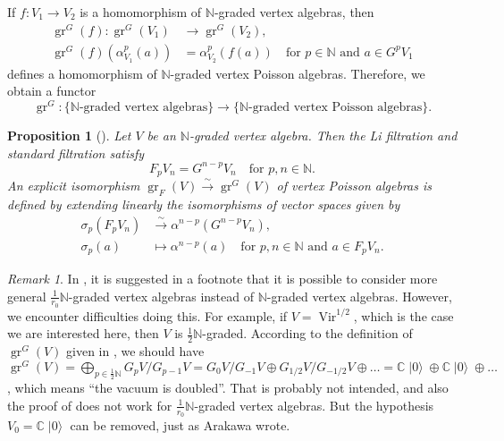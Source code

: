 \documentclass[a4paper, 12pt, reqno]{amsart}
\newtheorem{proposition}[theorem]{Proposition}
\theoremstyle{remark}
\newtheorem{remark}[theorem]{Remark}
\DeclareMathOperator{\Vir}{Vir}
\DeclareMathOperator{\gr}{gr}
\DeclareMathOperator{\vac}{|0\rangle}
\begin{document}
If $f: V_1 \to V_2$ is a homomorphism of $\mathbb{N}$-graded vertex algebras, then
\begin{align*}
  \gr^G(f): \gr^G(V_1) &\to \gr^G(V_2), \\
  \gr^G(f)(\alpha_{V_1}^p(a)) &= \alpha_{V_2}^p(f(a)) \quad \text{for $p \in \mathbb{N}$ and $a \in G^pV_1$}
\end{align*}
defines a homomorphism of $\mathbb{N}$-graded vertex Poisson algebras.
Therefore, we obtain a functor
\begin{equation*}
  \gr^G: \{\text{$\mathbb{N}$-graded vertex algebras}\} \to \{\text{$\mathbb{N}$-graded vertex Poisson algebras}\}.
\end{equation*}

\begin{proposition}[{\cite[Proposition 2.6.1]{arakawa_remark_2012}}]
  \label{prp:15}
  Let $V$ be an $\mathbb{N}$-graded vertex algebra.
  Then the Li filtration and standard filtration satisfy
  \begin{equation*}
    F_pV_n = G^{n - p}V_n \quad \text{for $p, n \in \mathbb{N}$}.
  \end{equation*}
  An explicit isomorphism $\gr_F(V) \xrightarrow{\sim} \gr^G(V)$ of vertex Poisson algebras is defined by extending linearly the isomorphisms of vector spaces given by
  \begin{align*}
    \sigma_p(F_pV_n) &\xrightarrow{\sim} \alpha^{n - p}(G^{n - p}V_n), \\
    \sigma_p(a) &\mapsto \alpha^{n - p}(a) \quad \text{for $p, n \in \mathbb{N}$ and $a \in F_pV_n$}.
  \end{align*}
\end{proposition}

\begin{remark}
  \label{rmk:39}
  In \cite{arakawa_remark_2012}, it is suggested in a footnote that it is possible to consider more general $\tfrac{1}{r_0}\mathbb{N}$-graded vertex algebras instead of $\mathbb{N}$-graded vertex algebras.
  However, we encounter difficulties doing this.
  For example, if $V = \Vir^{1/2}$, which is the case we are interested here, then $V$ is $\tfrac{1}{2}\mathbb{N}$-graded.
  According to the definition of $\gr^G(V)$ given in \cite{arakawa_remark_2012}, we should have $\gr^G(V) = \bigoplus_{p \in \frac{1}{2}\mathbb{N}}G_pV/G_{p - 1}V = G_0V/G_{-1}V \oplus G_{1/2}V/G_{-1/2}V \oplus \dots = \mathbb{C}\vac \oplus \mathbb{C}\vac \oplus \dots$, which means ``the vacuum is doubled''.
  That is probably not intended, and also the proof of \cite[Proposition 2.6.1]{arakawa_remark_2012} does not work for $\tfrac{1}{r_0}\mathbb{N}$-graded vertex algebras.
  But the hypothesis $V_0 = \mathbb{C}\vac$ can be removed, just as Arakawa wrote.
\end{remark}
\end{document}
